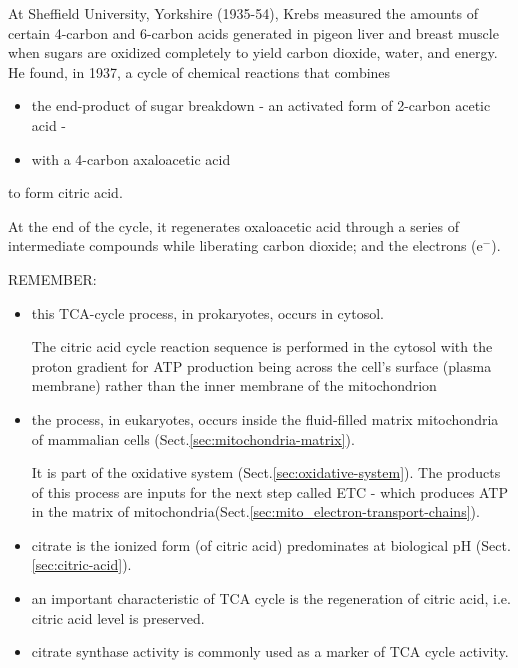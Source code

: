 At Sheffield University, Yorkshire (1935-54), Krebs measured the amounts of
certain 4-carbon and 6-carbon acids generated in pigeon liver and breast muscle
when sugars are oxidized completely to yield carbon dioxide, water, and energy.
He found, in 1937, {\ig a cycle of chemical reactions} that combines
\begin{itemize}
  \item  the end-product of sugar breakdown - an activated form of 2-carbon acetic acid -
  \item with a 4-carbon axaloacetic acid 
\end{itemize}
to form citric acid.

At the end of the cycle, it regenerates oxaloacetic acid through a series of
intermediate compounds while liberating carbon dioxide; and the electrons
(e$^{-}$).

REMEMBER:
\begin{itemize}
  \item this TCA-cycle process, in prokaryotes, occurs in cytosol.

The citric acid cycle reaction sequence is performed in the cytosol with the
proton gradient for ATP production being across the cell's surface (plasma
membrane) rather than the inner membrane of the mitochondrion

  \item the process, in eukaryotes, occurs inside the fluid-filled matrix
  mitochondria of mammalian cells (Sect.\ref{sec:mitochondria-matrix}).

It is part of the oxidative system (Sect.\ref{sec:oxidative-system}).  The
products of this process are inputs for the next step called ETC - which
produces ATP in the matrix of
mitochondria(Sect.\ref{sec:mito_electron-transport-chains}).

  \item citrate is the ionized form (of citric acid) predominates at biological
  pH (Sect.\ref{sec:citric-acid}).

   \item an important characteristic of TCA cycle is the regeneration of citric
   acid, i.e. citric acid level is preserved.

   \item citrate synthase activity is commonly used as a marker of TCA
   cycle activity.

\end{itemize}


